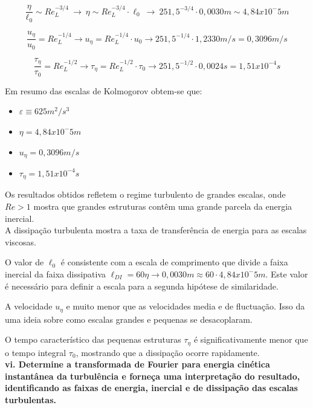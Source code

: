 \documentclass[12pt]{article}
\begin{document}
\begin{equation}
	\frac{\eta}{\ell_0} \sim Re_L^{-3/4} \ \rightarrow \ \eta  \sim Re_L^{-3/4} \cdot \ell_0 \ \rightarrow \ 251,5^{-3/4} \cdot 0,0030m \sim 4,84 x 10^-5 m 
\end{equation}

\begin{equation}
	\frac{u_\eta}{u_0} = Re_L^{-1/4} \rightarrow u_\eta= Re_L^{-1/4} \cdot u_0 \rightarrow 251,5^{-1/4} \cdot 1,2330 m/s = 0,3096 m/s
\end{equation}

\begin{equation}
	\frac{\tau_\eta}{\tau_0} = Re_L^{-1/2} \rightarrow \tau_\eta = Re_L^{-1/2} \cdot \tau_0 \rightarrow 251,5^{-1/2} \cdot 0,0024 s = 1,51x10^{-4} s
\end{equation}

Em resumo das escalas de Kolmogorov obtem-se que:
\begin{itemize}
	\item $\varepsilon \equiv 625 m^2/s^3 $
	\item $\eta = 4,84 x 10^-5 m$
	\item $u_\eta = 0,3096 m/s$
	\item $\tau_\eta = 1,51x10^{-4} s$
\end{itemize}

Os resultados obtidos refletem o regime turbulento de grandes escalas, onde $Re>1$ mostra que grandes estruturas contêm uma grande parcela da energia inercial.\\
A dissipação turbulenta mostra a taxa de transferência de energia para as escalas viscosas.

O valor de $\ell_0$ é consistente com a escala de comprimento que divide a faixa inercial da faixa dissipativa $\ell_{DI} = 60 \eta \rightarrow 0,0030 m \approx 60\cdot  4,84 x 10^-5 m  $. Este valor é necessário para definir a escala para a segunda hipótese de similaridade.

A velocidade $u_\eta$ e muito menor que as velocidades media e de fluctuação. Isso da uma ideia sobre como escalas grandes e pequenas se desacoplaram.

O tempo característico das pequenas estruturas $\tau_\eta$ é significativamente menor que o tempo integral $\tau_0$, mostrando que a dissipação ocorre rapidamente. \\
\textbf{vi. Determine a transformada de Fourier para energia cinética instantânea da turbulência e
forneça uma interpretação do resultado, identificando as faixas de energia, inercial e de
dissipação das escalas turbulentas.}
\end{document}
